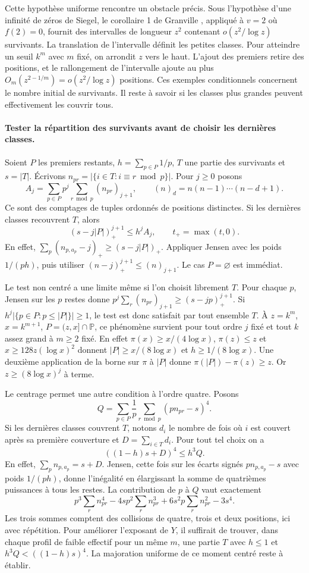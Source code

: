 \documentclass[11pt,a4paper]{article}
\begin{document}
Cette hypothèse uniforme rencontre un obstacle précis. Sous l'hypothèse
d'une infinité de zéros de Siegel, le corollaire 1 de Granville
\cite{granville}, appliqué à $v=2$ où $f(2)=0$, fournit des intervalles
de longueur $z^2$ contenant $o(z^2/\log z)$ survivants. La translation
de l'intervalle définit les petites classes. Pour atteindre un seuil
$k^m$ avec $m$ fixé, on arrondit $z$ vers le haut. L'ajout des
premiers retire des positions, et le rallongement de l'intervalle
ajoute au plus $O_m(z^{2-1/m})=o(z^2/\log z)$ positions.
Ces exemples conditionnels concernent le nombre initial de survivants.
Il reste à savoir si les classes plus grandes peuvent effectivement
les couvrir tous.

\paragraph{Tester la répartition des survivants avant de choisir les dernières classes.}
Soient $P$ les premiers restants, $h=\sum_{p\in P}1/p$, $T$ une partie
des survivants et $s=|T|$. Écrivons $n_{pr}=|\{i\in T:i\equiv r\bmod p\}|$.
Pour $j\ge0$ posons
\[
 A_j=\sum_{p\in P}p^j\sum_{r\bmod p}(n_{pr})_{j+1},
 \qquad (n)_d=n(n-1)\cdots(n-d+1).
\]
Ce sont des comptages de tuples ordonnés de positions distinctes. Si les
dernières classes recouvrent $T$, alors
\[
       (s-j|P|)_+^{j+1}\le h^j A_j,\qquad t_+=\max(t,0).
\]
En effet, $\sum_p(n_{p,a_p}-j)_+\ge(s-j|P|)_+$. Appliquer Jensen
avec les poids $1/(ph)$, puis utiliser $(n-j)_+^{j+1}\le(n)_{j+1}$.
Le cas $P=\varnothing$ est immédiat.

Le test non centré a une limite même si l'on choisit librement $T$.
Pour chaque $p$, Jensen sur les $p$ restes donne
$p^j\sum_r(n_{pr})_{j+1}\ge(s-jp)_+^{j+1}$.
Si $h^j|\{p\in P:p\le|P|\}|\ge1$, le test est donc satisfait par tout
ensemble $T$. À $z=k^m$, $x=k^{m+1}$, $P=(z,x]\cap\mathbb P$,
ce phénomène survient pour tout ordre $j$ fixé et tout $k$ assez grand
à $m\ge2$ fixé. En effet $\pi(x)\ge x/(4\log x)$, $\pi(z)\le z$ et
$x\ge128z(\log x)^2$ donnent $|P|\ge x/(8\log x)$ et
$h\ge1/(8\log x)$. Une deuxième application de la borne sur $\pi$ à
$|P|$ donne $\pi(|P|)-\pi(z)\ge z$. Or $z\ge(8\log x)^j$ à terme.

Le centrage permet une autre condition à l'ordre quatre. Posons
\[
  Q=\sum_{p\in P}\frac1p\sum_{r\bmod p}(p n_{pr}-s)^4 .
\]
Si les dernières classes couvrent $T$, notons $d_i$ le nombre de fois
où $i$ est couvert après sa première couverture et $D=\sum_{i\in T}d_i$.
Pour tout tel choix on a
\[
                 ((1-h)s+D)^4\le h^3 Q .
\]
En effet, $\sum_p n_{p,a_p}=s+D$. Jensen, cette fois sur les écarts
signés $p n_{p,a_p}-s$ avec poids $1/(ph)$, donne l'inégalité en
élargissant la somme de quatrièmes puissances à tous les restes.
La contribution de $p$ à $Q$ vaut exactement
\[
 p^3\sum_r n_{pr}^4-4sp^2\sum_r n_{pr}^3
           +6s^2p\sum_r n_{pr}^2-3s^4 .
\]
Les trois sommes comptent des collisions de quatre, trois et deux
positions, ici avec répétition. Pour améliorer l'exposant de $Y$, il
suffirait de trouver, dans chaque profil de faible effectif pour un
même $m$, une partie $T$ avec $h\le1$ et $h^3Q<((1-h)s)^4$. La
majoration uniforme de ce moment centré reste à établir.
\end{document}

